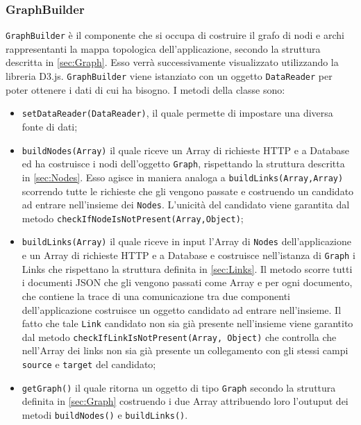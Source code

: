 \subsubsection{GraphBuilder}
\label{sec:GraphBuilder}
	\texttt{GraphBuilder} è il componente che si occupa di costruire il grafo di nodi e archi rappresentanti la mappa topologica dell'applicazione, secondo la struttura descritta in \ref{sec:Graph}. Esso verrà successivamente visualizzato utilizzando la libreria D3.js. \texttt{GraphBuilder} viene istanziato con un oggetto \texttt{DataReader} per poter ottenere i dati di cui ha bisogno.
	I metodi della classe sono:
	\begin{itemize}
		\item{\texttt{setDataReader(DataReader)}, il quale permette di impostare una diversa fonte di dati; }
		
		\item{\texttt{buildNodes(Array)} il quale riceve un Array di richieste HTTP e a Database ed ha costruisce i nodi dell'oggetto \texttt{Graph}, rispettando la struttura descritta in \ref{sec:Nodes}. Esso agisce in maniera analoga a \texttt{buildLinks(Array,Array)} scorrendo tutte le richieste che gli vengono passate e costruendo un candidato ad entrare nell'insieme dei \texttt{Nodes}. L'unicità del candidato viene garantita dal metodo \texttt{checkIfNodeIsNotPresent(Array,Object)};}
				
		\item{\texttt{buildLinks(Array)} il quale riceve in input l'Array di \texttt{Nodes} dell'applicazione e un Array di richieste HTTP e a Database e costruisce nell'istanza di \texttt{Graph} i Links che rispettano la struttura definita in \ref{sec:Links}. Il metodo scorre tutti i documenti JSON che gli vengono passati come Array e per ogni documento, che contiene la trace di una comunicazione tra due componenti dell'applicazione costruisce un oggetto candidato ad entrare nell'insieme. Il fatto che tale \texttt{Link} candidato non sia già presente nell'insieme viene garantito dal metodo \texttt{checkIfLinkIsNotPresent(Array, Object)} che controlla che nell'Array dei links non sia già presente un collegamento con gli stessi campi \texttt{source} e \texttt{target} del candidato; }

		\item{\texttt{getGraph()} il quale ritorna un oggetto di tipo \texttt{Graph} secondo la struttura definita in \ref{sec:Graph} costruendo i due Array attribuendo loro l'outuput dei metodi \texttt{buildNodes()} e \texttt{buildLinks()}.  }
	\end{itemize}
